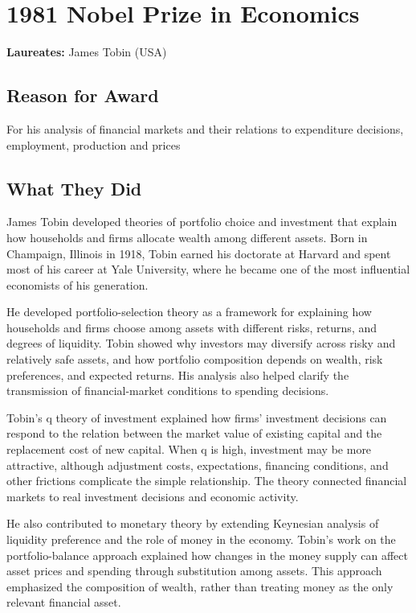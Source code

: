 \chapter{1981 Nobel Prize in Economics}
\textbf{Laureates: }James Tobin (USA)

\section*{Reason for Award}
For his analysis of financial markets and their relations to expenditure decisions, employment, production and prices

\section{What They Did}
James Tobin developed theories of portfolio choice and investment that explain
how households and firms allocate wealth among different assets. Born in
Champaign, Illinois in 1918, Tobin earned his doctorate at Harvard and spent
most of his career at Yale University, where he became one of the most
influential economists of his generation.

He developed portfolio-selection theory as a framework for explaining how
households and firms choose among assets with different risks, returns, and
degrees of liquidity. Tobin showed why investors may diversify across risky
and relatively safe assets, and how portfolio composition depends on wealth,
risk preferences, and expected returns. His analysis also helped clarify the
transmission of financial-market conditions to spending decisions.

Tobin's q theory of investment explained how firms' investment decisions can
respond to the relation between the market value of existing capital and the
replacement cost of new capital. When q is high, investment may be more
attractive, although adjustment costs, expectations, financing conditions, and
other frictions complicate the simple relationship. The theory connected
financial markets to real investment decisions and economic activity.

He also contributed to monetary theory by extending Keynesian analysis of
liquidity preference and the role of money in the economy. Tobin's work on the
portfolio-balance approach explained how changes in the money supply can
affect asset prices and spending through substitution among assets. This
approach emphasized the composition of wealth, rather than treating money as
the only relevant financial asset.

